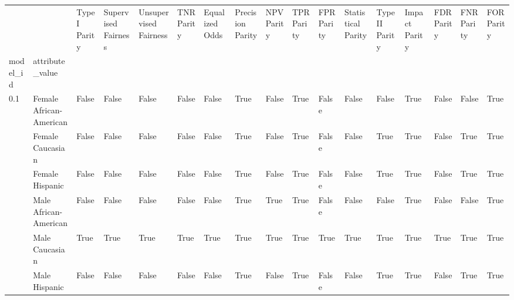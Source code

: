 \begin{tabular}{lllllllllllllllll}
\toprule
    &               &  TypeI Parity &  Supervised Fairness &  Unsupervised Fairness &  TNR Parity &  Equalized Odds &  Precision Parity &  NPV Parity &  TPR Parity &  FPR Parity &  Statistical Parity &  TypeII Parity &  Impact Parity &  FDR Parity &  FNR Parity &  FOR Parity \\
model\_id & attribute\_value &               &                      &                        &             &                 &                   &             &             &             &                     &                &                &             &             &             \\
\midrule
0.1 & Female African-American &         False &                False &                  False &       False &           False &              True &       False &        True &       False &               False &          False &           True &       False &       False &        True \\
    & Female Caucasian &         False &                False &                  False &       False &           False &              True &       False &        True &       False &               False &           True &           True &       False &        True &        True \\
    & Female Hispanic &         False &                False &                  False &       False &           False &              True &       False &        True &       False &               False &           True &           True &       False &        True &        True \\
    & Male African-American &         False &                False &                  False &       False &           False &              True &        True &        True &       False &               False &          False &           True &       False &       False &        True \\
    & Male Caucasian &          True &                 True &                   True &        True &            True &              True &        True &        True &        True &                True &           True &           True &        True &        True &        True \\
    & Male Hispanic &         False &                False &                  False &       False &           False &              True &       False &        True &       False &               False &           True &           True &       False &        True &        True \\

\end{tabular}
